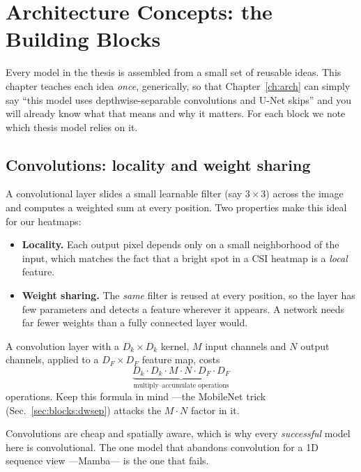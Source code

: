 \chapter{Architecture Concepts: the Building Blocks}
\label{ch:blocks}

Every model in the thesis is assembled from a small set of reusable ideas. This chapter teaches each
idea \emph{once}, generically, so that Chapter~\ref{ch:arch} can simply say ``this model uses
depthwise-separable convolutions and U-Net skips'' and you will already know what that means and why
it matters. For each block we note which thesis model relies on it.

\section{Convolutions: locality and weight sharing}
\label{sec:blocks:conv}

A convolutional layer slides a small learnable filter (say $3\times3$) across the image and computes a
weighted sum at every position. Two properties make this ideal for our heatmaps:
\begin{itemize}[leftmargin=1.4em,nosep]
  \item \textbf{Locality.} Each output pixel depends only on a small neighborhood of the input, which
  matches the fact that a bright spot in a CSI heatmap is a \emph{local} feature.
  \item \textbf{Weight sharing.} The \emph{same} filter is reused at every position, so the layer has
  few parameters and detects a feature wherever it appears. A network needs far fewer weights than a
  fully connected layer would.
\end{itemize}
A convolution layer with a $D_k\times D_k$ kernel, $M$ input channels and $N$ output channels, applied
to a $D_F\times D_F$ feature map, costs
\[
  \underbrace{D_k \cdot D_k \cdot M \cdot N \cdot D_F \cdot D_F}_{\text{multiply--accumulate operations}}
\]
operations. Keep this formula in mind ---the MobileNet trick (Sec.~\ref{sec:blocks:dwsep}) attacks the
$M\cdot N$ factor in it.

\begin{keyidea}
Convolutions are cheap and spatially aware, which is why every \emph{successful} model here is
convolutional. The one model that abandons convolution for a 1D sequence view ---Mamba--- is the one
that fails.
\end{keyidea}

